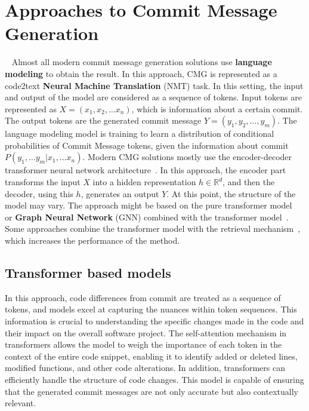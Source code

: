 \section{Approaches to Commit Message Generation}~\label{sec:CMG_approaches}
Almost all modern commit message generation solutions use \textbf{ language modeling} to obtain the result. In this approach, CMG is represented as a code2text \textbf{Neural Machine Translation} (NMT) task. In this setting, the input and output of the model are considered as a sequence of tokens. Input tokens are represented as $X = (x_1, x_2, \dots x_n)$, which is information about a certain commit. The output tokens are the generated commit message $Y = (y_1, y_2, \dots, y_m)$. The language modeling model is training to learn a distribution of conditional probabilities of Commit Message tokens, given the information about commit $P(y_1,\dots y_m | x_1, \dots x_n)$. 
Modern CMG solutions mostly use the encoder-decoder transformer neural network architecture~\cite{eliseeva2023commit, liu2022commitbart,jung2021commitbert, елисееваавтодополнение}. In this approach, the encoder part transforms the input $X$ into a hidden representation $h \in \mathbb{R}^{d}$, and then the decoder, using this $h$, generates an output $Y$. At this point, the structure of the model may vary. The approach might be based on the pure transformer model~\cite{jung2021commitbert,liu2022commitbart} or \textbf{Graph Neural Network} (GNN) combined with the transformer model~\cite{dong2022fira, liu2020atom}. Some approaches combine the transformer model with the retrieval mechanism~\cite{shi2022race}, which increases the performance of the method.

\subsection{Transformer based models}\label{sec:transformers_for_cmg}
In this approach, code differences from commit are treated as a sequence of tokens, and models excel at capturing the nuances within token sequences. This information is crucial to understanding the specific changes made in the code and their impact on the overall software project. The self-attention mechanism in transformers allows the model to weigh the importance of each token in the context of the entire code snippet, enabling it to identify added or deleted lines, modified functions, and other code alterations. In addition, transformers can efficiently handle the structure of code changes. This model is capable of ensuring that the generated commit messages are not only accurate but also contextually relevant. 

